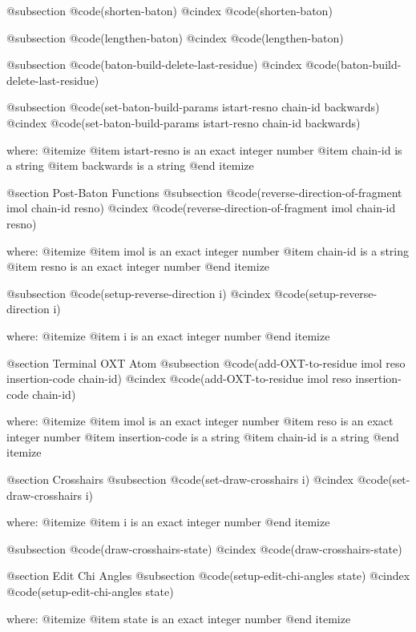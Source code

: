@subsection @code{(shorten-baton)}
@cindex @code{(shorten-baton)}
 
@subsection @code{(lengthen-baton)}
@cindex @code{(lengthen-baton)}
 
@subsection @code{(baton-build-delete-last-residue)}
@cindex @code{(baton-build-delete-last-residue)}
 
@subsection @code{(set-baton-build-params istart-resno chain-id backwards)}
@cindex @code{(set-baton-build-params istart-resno chain-id backwards)}
 
where: 
 @itemize 
     @item istart-resno is an exact integer number
     @item chain-id is a string
     @item backwards is a string
 @end itemize



@section Post-Baton Functions 
@subsection @code{(reverse-direction-of-fragment imol chain-id resno)}
@cindex @code{(reverse-direction-of-fragment imol chain-id resno)}
 
where: 
 @itemize 
     @item imol is an exact integer number
     @item chain-id is a string
     @item resno is an exact integer number
 @end itemize


@subsection @code{(setup-reverse-direction i)}
@cindex @code{(setup-reverse-direction i)}
 
where: 
 @itemize 
     @item i is an exact integer number
 @end itemize



@section Terminal OXT Atom 
@subsection @code{(add-OXT-to-residue imol reso insertion-code chain-id)}
@cindex @code{(add-OXT-to-residue imol reso insertion-code chain-id)}
 
where: 
 @itemize 
     @item imol is an exact integer number
     @item reso is an exact integer number
     @item insertion-code is a string
     @item chain-id is a string
 @end itemize



@section Crosshairs 
@subsection @code{(set-draw-crosshairs i)}
@cindex @code{(set-draw-crosshairs i)}
 
where: 
 @itemize 
     @item i is an exact integer number
 @end itemize


@subsection @code{(draw-crosshairs-state)}
@cindex @code{(draw-crosshairs-state)}
 

@section Edit Chi Angles 
@subsection @code{(setup-edit-chi-angles state)}
@cindex @code{(setup-edit-chi-angles state)}
 
where: 
 @itemize 
     @item state is an exact integer number
 @end itemize



